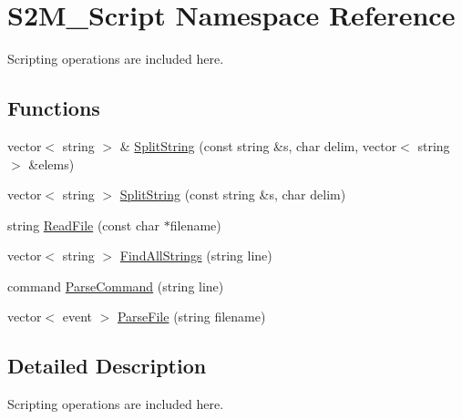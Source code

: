 \hypertarget{namespace_s2_m___script}{\section{S2\-M\-\_\-\-Script Namespace Reference}
\label{namespace_s2_m___script}
}


Scripting operations are included here.  


\subsection*{Functions}
\begin{DoxyCompactItemize}
\item 
vector$<$ string $>$ \& \hyperlink{namespace_s2_m___script_a82cb25f8c733c45f409944f43b33395c}{Split\-String} (const string \&s, char delim, vector$<$ string $>$ \&elems)
\item 
vector$<$ string $>$ \hyperlink{namespace_s2_m___script_acad41aa1929d33e361136857b5fcea9d}{Split\-String} (const string \&s, char delim)
\item 
string \hyperlink{namespace_s2_m___script_afb8beccf6c1911fa009e53d6d17a1169}{Read\-File} (const char $\ast$filename)
\item 
vector$<$ string $>$ \hyperlink{namespace_s2_m___script_a84cd920d794f9507e7a3dedc10f74824}{Find\-All\-Strings} (string line)
\item 
command \hyperlink{namespace_s2_m___script_abb271a3779c39ef9f640075753bbe9a1}{Parse\-Command} (string line)
\item 
vector$<$ event $>$ \hyperlink{namespace_s2_m___script_a38a3fadde1e0a2adc53f13e29324aaf9}{Parse\-File} (string filename)
\end{DoxyCompactItemize}


\subsection{Detailed Description}
Scripting operations are included here. 


